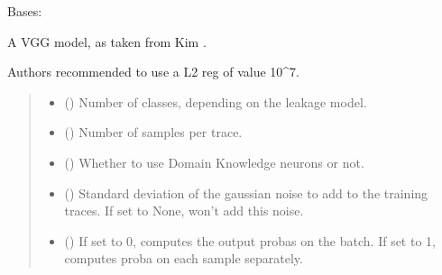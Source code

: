 \documentclass[letterpaper,10pt,english]{sphinxmanual}
\begin{document}
\begin{fulllineitems}
\label{\detokenize{MLSCAlib.Architectures:MLSCAlib.Architectures.torch_models.VGGNoise}}
\pysigstartsignatures
{}
\pysigstopsignatures
\sphinxAtStartPar
Bases: 

\sphinxAtStartPar
A VGG model, as taken from Kim \sphinxfootnotemark[12].

\sphinxAtStartPar
Authors recommended to use a L2 reg of value 10\textasciicircum{}\sphinxhyphen{}7.
\begin{quote}\begin{description}
\begin{itemize}
\item {} 
\sphinxAtStartPar
{} () \textendash{} Number of classes, depending on the leakage model.

\item {} 
\sphinxAtStartPar
{} () \textendash{} Number of samples per trace.

\item {} 
\sphinxAtStartPar
{} (\sphinxstyleliteralemphasis{\sphinxupquote{, }}) \textendash{} Whether to use Domain Knowledge neurons or not.

\item {} 
\sphinxAtStartPar
{} (\sphinxstyleliteralemphasis{\sphinxupquote{, }}) \textendash{} Standard deviation of the gaussian noise to add to the training traces. If set
to None, won’t add this noise.

\item {} 
\sphinxAtStartPar
{} (\sphinxstyleliteralemphasis{\sphinxupquote{, }}) \textendash{} If set to 0, computes the output probas on the batch. If set to 1, computes proba on
each sample separately.


\end{itemize}
\end{description}
\end{quote}
\end{fulllineitems}
\end{document}
